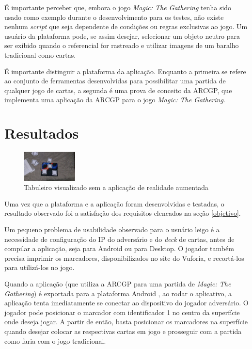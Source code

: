 \documentclass[conference]{IEEEtran}
\begin{document}
É importante perceber que, embora o jogo \textit{Magic: The Gathering} tenha 
sido usado como exemplo durante o desenvolvimento para os testes, não existe 
nenhum \textit{script} que seja dependente de condições ou regras exclusivas ao 
jogo. Um usuário da plataforma pode, se assim desejar, selecionar um objeto 
neutro para ser exibido quando o referencial for rastreado e utilizar imagens de 
um baralho tradicional como cartas.

É importante distinguir a plataforma da aplicação. Enquanto a primeira se refere 
ao conjunto de ferramentas desenvolvidas para possibilitar uma partida de 
qualquer jogo de cartas, a segunda é uma prova de conceito da ARCGP, que 
implementa uma aplicação da ARCGP para o jogo \textit{Magic: The Gathering}.

\section{Resultados}
\label{resultados}

\begin{figure}[b]
	\caption{Tabuleiro visualizado sem a aplicação de realidade aumentada}
	\label{owntablereal}
	\centering
	\includegraphics[width=0.25\textwidth]{owntablereal}
\end{figure}

Uma vez que a plataforma e a aplicação foram desenvolvidas e testadas, o 
resultado observado foi a satisfação dos requisitos elencados na seção 
\ref{objetivo}.

Um pequeno problema de usabilidade observado para o usuário leigo é a 
necessidade de configuração do IP do adversário e do \textit{deck} de cartas, 
antes de compilar a aplicação, seja para Android \cite{android} ou para Desktop. 
O jogador também precisa imprimir os marcadores, disponibilizados no site do 
Vuforia, e recortá-los para utilizá-los no jogo.

Quando a aplicação (que utiliza a ARCGP para uma partida de \textit{Magic: 
The Gathering}) é exportada para a plataforma Android \cite{android}, ao rodar o 
aplicativo, a aplicação tenta imediatamente se conectar ao dispositivo do 
jogador adversário. O jogador pode posicionar o marcador com identificador 1 no 
centro da superfície onde deseja jogar. A partir de então, basta posicionar os 
marcadores na superfície quando desejar colocar as respectivas cartas em jogo e 
prosseguir com a partida como faria com o jogo tradicional.
\end{document}
